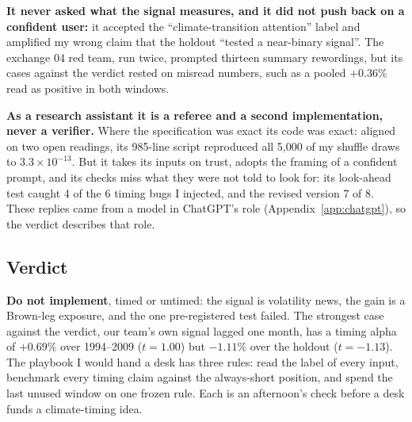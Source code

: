 \textbf{It never asked what the signal measures, and it did not push back on a confident user:} it accepted the ``climate-transition attention'' label and amplified my wrong claim that the holdout ``tested a near-binary signal''. The exchange 04 red team, run twice, prompted thirteen summary rewordings, but its cases against the verdict rested on misread numbers, such as a pooled $+0.36$\% read as positive in both windows.

\textbf{As a research assistant it is a referee and a second implementation, never a verifier.} Where the specification was exact its code was exact: aligned on two open readings, its 985-line script reproduced all 5,000 of my shuffle draws to $3.3\times10^{-13}$. But it takes its inputs on trust, adopts the framing of a confident prompt, and its checks miss what they were not told to look for: its look-ahead test caught 4 of the 6 timing bugs I injected, and the revised version 7 of 8. These replies came from a model in ChatGPT's role (Appendix~\ref{app:chatgpt}), so the verdict describes that role.

\subsection{Verdict}
\label{sec:verdict}

\textbf{Do not implement}, timed or untimed: the signal is volatility news, the gain is a Brown-leg exposure, and the one pre-registered test failed. The strongest case against the verdict, our team's own signal lagged one month, has a timing alpha of $+0.69$\% over 1994--2009 ($t=1.00$) but $-1.11$\% over the holdout ($t=-1.13$). The playbook I would hand a desk has three rules: read the label of every input, benchmark every timing claim against the always-short position, and spend the last unused window on one frozen rule. Each is an afternoon's check before a desk funds a climate-timing idea.

